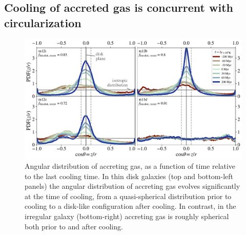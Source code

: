 \documentclass[fleqn,usenatbib]{mnras}
\begin{document}
\subsection{Cooling of accreted gas is concurrent with circularization}
\label{s: characteristics -- aligns}

\begin{figure}
    \centering
    \includegraphics[width=\textwidth]{figures/theta_vs_t.pdf}
    \caption{
    Angular distribution of accreting gas, as a function of time relative to the last cooling time.
    In thin disk galaxies (top and bottom-left panels) the angular distribution of accreting gas evolves significantly at the time of cooling, from a quasi-spherical distribution prior to cooling to a disk-like configuration after cooling. 
    In contrast, in the irregular galaxy (bottom-right) accreting gas is roughly spherical both prior to and after cooling.
    }
    \label{f: theta vs t}
\end{figure}
\end{document}
